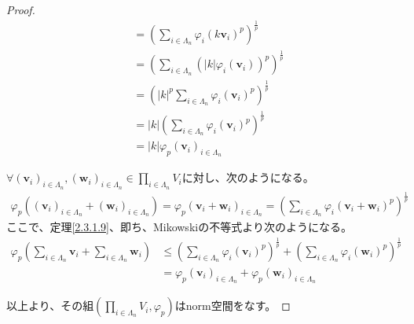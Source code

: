 \documentclass[dvipdfmx]{jsarticle}
\begin{document}
\begin{proof}
\begin{align*}
&= \left( \sum_{i \in \varLambda_{n}} {\varphi_{i}\left( k\mathbf{v}_{i} \right)}^{p} \right)^{\frac{1}{p}}\\
&= \left( \sum_{i \in \varLambda_{n}} \left( |k|\varphi_{i}\left( \mathbf{v}_{i} \right) \right)^{p} \right)^{\frac{1}{p}}\\
&= \left( |k|^{p}\sum_{i \in \varLambda_{n}} {\varphi_{i}\left( \mathbf{v}_{i} \right)}^{p} \right)^{\frac{1}{p}}\\
&= |k|\left( \sum_{i \in \varLambda_{n}} {\varphi_{i}\left( \mathbf{v}_{i} \right)}^{p} \right)^{\frac{1}{p}}\\
&= |k|\varphi_{p}\left( \mathbf{v}_{i} \right)_{i \in \varLambda_{n}}
\end{align*}\par
$\forall\left( \mathbf{v}_{i} \right)_{i \in \varLambda_{n}},\left( \mathbf{w}_{i} \right)_{i \in \varLambda_{n}} \in \prod_{i \in \varLambda_{n}} V_{i}$に対し、次のようになる。
\begin{align*}
\varphi_{p}\left( \left( \mathbf{v}_{i} \right)_{i \in \varLambda_{n}} + \left( \mathbf{w}_{i} \right)_{i \in \varLambda_{n}} \right) = \varphi_{p}\left( \mathbf{v}_{i} + \mathbf{w}_{i} \right)_{i \in \varLambda_{n}} = \left( \sum_{i \in \varLambda_{n}} {\varphi_{i}\left( \mathbf{v}_{i} + \mathbf{w}_{i} \right)}^{p} \right)^{\frac{1}{p}}
\end{align*}
ここで、定理\ref{2.3.1.9}、即ち、Mikowskiの不等式より次のようになる。
\begin{align*}
\varphi_{p}\left( \sum_{i \in \varLambda_{n}} \mathbf{v}_{i} + \sum_{i \in \varLambda_{n}} \mathbf{w}_{i} \right) &\leq \left( \sum_{i \in \varLambda_{n}} {\varphi_{i}\left( \mathbf{v}_{i} \right)}^{p} \right)^{\frac{1}{p}} + \left( \sum_{i \in \varLambda_{n}} {\varphi_{i}\left( \mathbf{w}_{i} \right)}^{p} \right)^{\frac{1}{p}}\\
&= \varphi_{p}\left( \mathbf{v}_{i} \right)_{i \in \varLambda_{n}} + \varphi_{p}\left( \mathbf{w}_{i} \right)_{i \in \varLambda_{n}}
\end{align*}\par
以上より、その組$\left( \prod_{i \in \varLambda_{n}} V_{i},\varphi_{p} \right)$はnorm空間をなす。
\end{proof}
\end{document}
